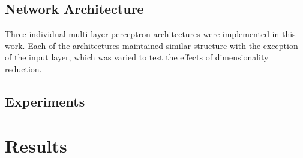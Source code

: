\documentclass[conference]{IEEEtran}
\begin{document}
	\subsection{Network Architecture}
	Three individual multi-layer perceptron architectures were implemented in this work.  Each of the architectures maintained similar structure with the exception of the input layer, which was varied to test the effects of dimensionality reduction.  
	
	
	





	


\subsection{Experiments} \label{Experiments}



\section{Results} \label{Results}





\end{document}
